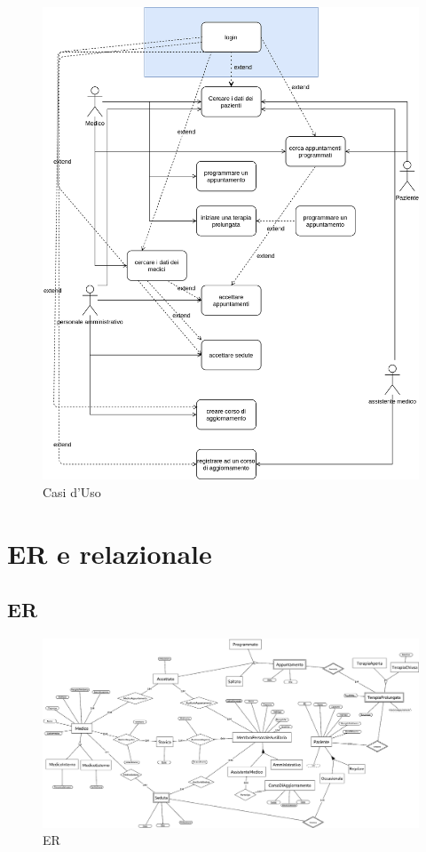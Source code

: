 \documentclass[11pt]{article}
\begin{document}
\begin{figure}[H]
    \includegraphics[width=\linewidth]{images/UseCases.png}
    \caption{Casi d'Uso}
    \label{fig:usecases}
\end{figure}

\section{ER e relazionale}

\subsection{ER}
\begin{figure}[H]
    \includegraphics[width=\linewidth]{images/ER1.png}
    \caption{ER}
    \label{fig:ER}
\end{figure}
\end{document}
